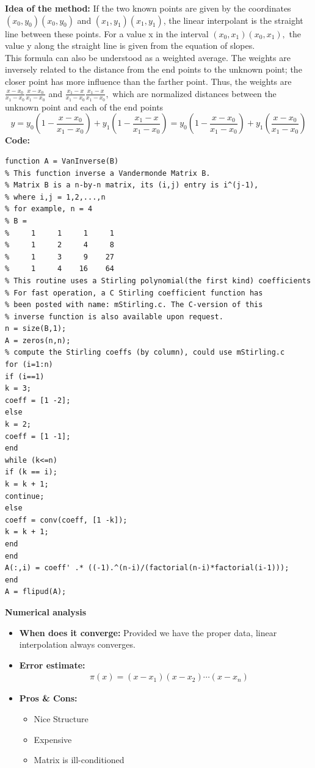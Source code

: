 \documentclass{article}
\begin{document}
	{\bf Idea of the method:} 
	If the two known points are given by the coordinates ${\displaystyle (x_{0},y_{0})} (x_{0},y_{0})$ and ${\displaystyle (x_{1},y_{1})} (x_{1},y_{1})$, the linear interpolant is the straight line between these points. For a value x in the interval ${\displaystyle (x_{0},x_{1})} (x_{0},x_{1}),$ the value y along the straight line is given from the equation of slopes.\\
	This formula can also be understood as a weighted average. The weights are inversely related to the distance from the end points to the unknown point; the closer point has more influence than the farther point. Thus, the weights are ${\textstyle {\frac {x-x_{0}}{x_{1}-x_{0}}}} {\textstyle {\frac  {x-x_{0}}{x_{1}-x_{0}}}}$ and ${\textstyle {\frac {x_{1}-x}{x_{1}-x_{0}}}} {\textstyle {\frac  {x_{1}-x}{x_{1}-x_{0}}}},$ which are normalized distances between the unknown point and each of the end points
	\[y = y _ { 0 } \left( 1 - \frac { x - x _ { 0 } } { x _ { 1 } - x _ { 0 } } \right) + y _ { 1 } \left( 1 - \frac { x _ { 1 } - x } { x _ { 1 } - x _ { 0 } } \right) = y _ { 0 } \left( 1 - \frac { x - x _ { 0 } } { x _ { 1 } - x _ { 0 } } \right) + y _ { 1 } \left( \frac { x - x _ { 0 } } { x _ { 1 } - x _ { 0 } } \right)\]
	{\bf Code:}
	\begin{verbatim}
function A = VanInverse(B)
% This function inverse a Vandermonde Matrix B. 
% Matrix B is a n-by-n matrix, its (i,j) entry is i^(j-1),
% where i,j = 1,2,...,n
% for example, n = 4
% B =
%     1     1     1     1
%     1     2     4     8
%     1     3     9    27
%     1     4    16    64
% This routine uses a Stirling polynomial(the first kind) coefficients
% For fast operation, a C Stirling coefficient function has
% been posted with name: mStirling.c. The C-version of this 
% inverse function is also available upon request.
n = size(B,1);
A = zeros(n,n);
% compute the Stirling coeffs (by column), could use mStirling.c
for (i=1:n)
if (i==1) 
k = 3;
coeff = [1 -2];
else
k = 2;
coeff = [1 -1];
end
while (k<=n)
if (k == i);
k = k + 1;
continue;
else
coeff = conv(coeff, [1 -k]);
k = k + 1;
end
end
A(:,i) = coeff' .* ((-1).^(n-i)/(factorial(n-i)*factorial(i-1)));
end
A = flipud(A);
	\end{verbatim}
	{\bf Numerical analysis}
	\begin{itemize}
		\item{\bf When does it converge:} Provided we have the proper data, linear interpolation always converges.
		\item {\bf Error estimate:}
		\begin{equation}
		\begin{split}
		& \pi(x) = (x − x_1)(x − x_2)\cdots(x − x_n)
		\end{split}
		\end{equation}
		\item {\bf Pros \& Cons:}
		\begin{itemize}
			\item Nice Structure
			\item Expensive
			\item Matrix is ill-conditioned
		\end{itemize}
	\end{itemize}
\end{document}
